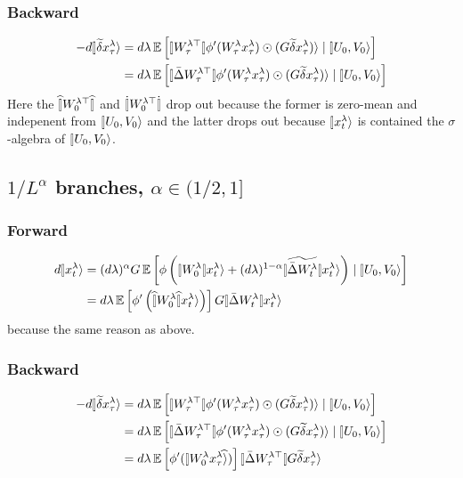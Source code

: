 \documentclass{article}
\theoremstyle{plain}
\theoremstyle{definition}
\begin{document}
\subsubsection{Backward}

\begin{align*}
-d\ket{\tilde\delta x_{\tau}^{\lambda}} & =d\lambda\EV\left[\oplim{W_{\tau}^{\lambda\trsp}}\phi'(W_{\tau}^{\lambda}x_{\tau}^{\lambda})\odot(G\tilde\delta x_{\tau}^{\lambda})\ra\mid\ket{U_{0},V_{0}}\right]\\
 & =d\lambda\EV\left[\oplim{\bar{\Delta}W_{\tau}^{\lambda\trsp}}\phi'(W_{\tau}^{\lambda}x_{\tau}^{\lambda})\odot(G\tilde\delta x_{\tau}^{\lambda})\ra\mid\ket{U_{0},V_{0}}\right]
\end{align*}
Here the $\hatoplim{W_{0}^{\lambda\trsp}}$ and $\dotoplim{W_{0}^{\lambda\trsp}}$
drop out because the former is zero-mean and indepenent from $\ket{U_{0},V_{0}}$
and the latter drops out because $\ket{x_{t}^{\lambda}}$ is contained
the $\sigma$-algebra of $\ket{U_{0},V_{0}}$.

\subsection{$1/L^{\alpha}$ branches, $\alpha\in(1/2,1]$}\label{heuristics:smooth_limits}

\subsubsection{Forward}

\begin{align*}
d\ket{x_{t}^{\lambda}} & =(d\lambda)^{\alpha}G\EV\left[\phi\left(\oplim{W_{0}^{\lambda}}x_{t}^{\lambda}\ra+(d\lambda)^{1-\alpha}\widetilde{\oplim{\bar{\Delta}W_{t}^{\lambda}}}x_{t}^{\lambda}\ra\right)\mid\ket{U_{0},V_{0}}\right]\\
 & =d\lambda\EV\left[\phi'\left(\hatoplim{W_{0}^{\lambda}}x_{t}^{\lambda}\ra\right)\right]G\oplim{\bar{\Delta}W_{t}^{\lambda}}x_{t}^{\lambda}\ra
\end{align*}
because the same reason as above.

\subsubsection{Backward}

\begin{align*}
-d\ket{\tilde\delta x_{\tau}^{\lambda}} & =d\lambda\EV\left[\oplim{W_{\tau}^{\lambda\trsp}}\phi'(W_{\tau}^{\lambda}x_{\tau}^{\lambda})\odot(G\tilde\delta x_{\tau}^{\lambda})\ra\mid\ket{U_{0},V_{0}}\right]\\
 & =d\lambda\EV\left[\oplim{\bar{\Delta}W_{\tau}^{\lambda\trsp}}\phi'(W_{\tau}^{\lambda}x_{\tau}^{\lambda})\odot(G\tilde\delta x_{\tau}^{\lambda})\ra\mid\ket{U_{0},V_{0}}\right]\\
 & =d\lambda\EV\left[\phi'(\hatket{W_{0}^{\lambda}x_{\tau}^{\lambda}})\right]\oplim{\bar{\Delta}W_{\tau}^{\lambda\trsp}}G\tilde\delta x_{\tau}^{\lambda}\ra
\end{align*}
\end{document}

